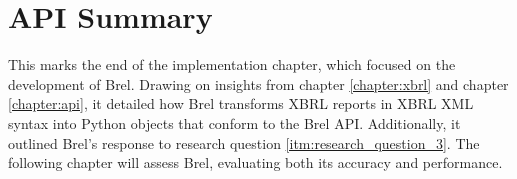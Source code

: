 
\section{API Summary}

This marks the end of the implementation chapter,  
which focused on the development of Brel.  
Drawing on insights from chapter \ref{chapter:xbrl} and chapter \ref{chapter:api}, it detailed  
how Brel transforms XBRL reports in XBRL XML syntax into Python objects that conform to the Brel API.  
Additionally, it outlined Brel's response to research question \ref{itm:research_question_3}.  
The following chapter will assess Brel, evaluating both its accuracy and performance.
